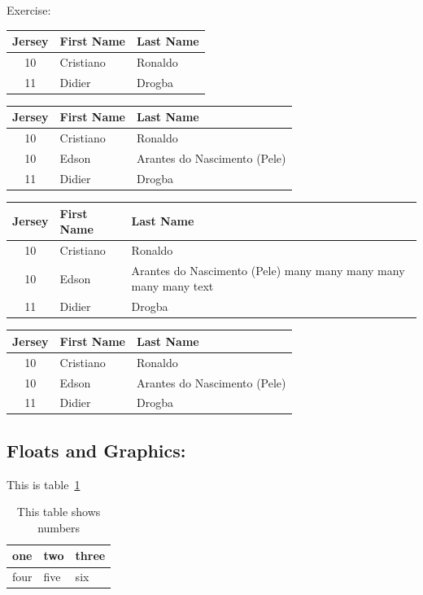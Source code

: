 \documentclass[letterpaper, notitlepage, 12pt]{article}
\begin{document}
Exercise:\\
\begin{center} %
\begin{tabular}{c||l|l}
Jersey & First Name & Last Name \\
\hline \hline
10 & Cristiano & Ronaldo \\
\hline
11 & Didier & Drogba
\end{tabular}
\end{center}

\begin{center}
\begin{tabular}{c||l|l}
Jersey & First Name & Last Name \\
\hline \hline
10 & Cristiano & Ronaldo \\
\hline
10 & Edson & Arantes do Nascimento (Pele) \\
\hline
11 & Didier & Drogba
\end{tabular}
\end{center}


\begin{center}
\begin{tabular}{c||l|p{1in}}
Jersey & First Name & Last Name \\
\hline \hline
10 & Cristiano & Ronaldo \\
\hline
10 & Edson & Arantes do Nascimento (Pele) many many many many many many text\\
\hline
11 & Didier & Drogba
\end{tabular}
\end{center}

\begin{center}
\begin{tabular}{c||l|p{1in}}
Jersey & First Name & Last Name \\
\hline \hline
10 & Cristiano & Ronaldo \\
\hline
10 & Edson & Arantes \newline do Nascimento (Pele) \\
\hline
11 & Didier & Drogba
\end{tabular}
\end{center}

\subsection{Floats and Graphics:}
This is table~\ref{mytable}
\begin{table}[b]
\begin{center}
\begin{tabular}{|c||l|p{1in}|}
one & two & three \\
\hline
four & five & six
\end{tabular}
\end{center}
\caption{ \label{mytable}
This table shows numbers}
\end{table}
\end{document}
